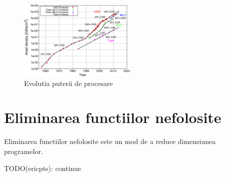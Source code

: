 \begin{figure}
  \centering
  \includegraphics[width=0.5\textwidth]{memory_trends}
  \caption{Evolutia puterii de procesare\cite{memory_trends} }
  \label{fig:memory_trends}
\end{figure}

\section{Eliminarea functiilor nefolosite}

Eliminarea functiilor nefolosite este un mod de a reduce
dimensiunea programelor.

TODO(ericpts): continue
